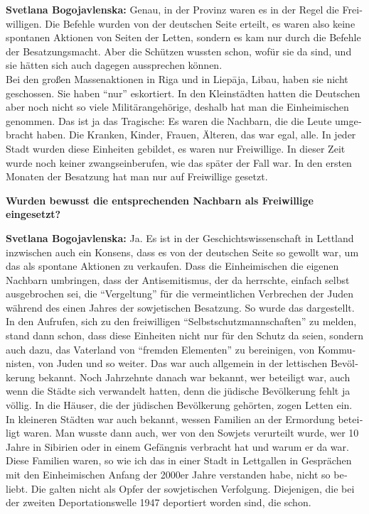 \begin{otherlanguage}{ngerman}
\textbf{Svetlana Bogojavlenska:} Genau, in der Provinz waren es in der Regel die Freiwilligen. Die Befehle wurden von der deutschen Seite erteilt, es waren also keine spontanen Aktionen von Seiten der Letten, sondern es kam nur durch die Befehle der Besatzungsmacht. Aber die Schützen wussten schon, wofür sie da sind, und sie hätten sich auch dagegen aussprechen können.\\
Bei den großen Massenaktionen in Riga und in Liepāja, Libau, haben sie nicht geschossen. Sie haben "`nur"' eskortiert. In den Kleinstädten hatten die Deutschen aber noch nicht so viele Militärangehörige, deshalb hat man die Einheimischen genommen. Das ist ja das Tragische: Es waren die Nachbarn, die die Leute umgebracht haben. Die Kranken, Kinder, Frauen, Älteren, das war egal, alle. In jeder Stadt wurden diese Einheiten gebildet, es waren nur Freiwillige. In dieser Zeit wurde noch keiner zwangseinberufen, wie das später der Fall war. In den ersten Monaten der Besatzung hat man nur auf Freiwillige gesetzt.

\textbf{Wurden bewusst die entsprechenden Nachbarn als Freiwillige eingesetzt?}

\textbf{Svetlana Bogojavlenska:} Ja. Es ist in der Geschichtswissenschaft in Lettland inzwischen auch ein Konsens, dass es von der deutschen Seite so gewollt war, um das als spontane Aktionen zu verkaufen. Dass die Einheimischen die eigenen Nachbarn umbringen, dass der Antisemitismus, der da herrschte, einfach selbst ausgebrochen sei, die "`Vergeltung"' für die vermeintlichen Verbrechen der Juden während des einen Jahres der sowjetischen Besatzung. So wurde das dargestellt. In den Aufrufen, sich zu den freiwilligen "`Selbstschutzmannschaften"' zu melden, stand dann schon, dass diese Einheiten nicht nur für den Schutz da seien, sondern auch dazu, das Vaterland von "`fremden Elementen"' zu bereinigen, von Kommunisten, von Juden und so weiter. Das war auch allgemein in der lettischen Bevölkerung bekannt. Noch Jahrzehnte danach war bekannt, wer beteiligt war, auch wenn die Städte sich verwandelt hatten, denn die jüdische Bevölkerung fehlt ja völlig. In die Häuser, die der jüdischen Bevölkerung gehörten, zogen Letten ein. In kleineren Städten war auch bekannt, wessen Familien an der Ermordung beteiligt waren. Man wusste dann auch, wer von den Sowjets verurteilt wurde, wer 10 Jahre in Sibirien oder in einem Gefängnis verbracht hat und warum er da war. Diese Familien waren, so wie ich das in einer Stadt in Lettgallen in Gesprächen mit den Einheimischen Anfang der 2000er Jahre verstanden habe, nicht so beliebt. Die galten nicht als Opfer der sowjetischen Verfolgung. Diejenigen, die bei der zweiten Deportationswelle 1947 deportiert worden sind, die schon.


\end{otherlanguage}

